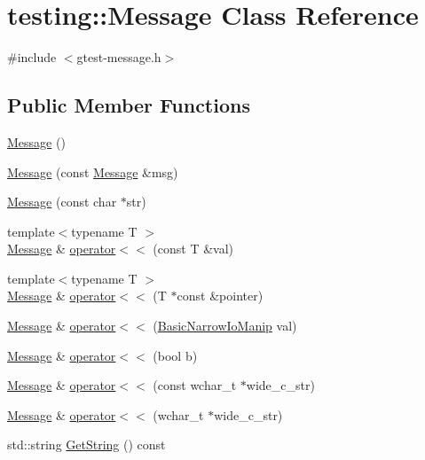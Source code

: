 \hypertarget{classtesting_1_1Message}{}\section{testing\+:\+:Message Class Reference}
\label{classtesting_1_1Message}


{\ttfamily \#include $<$gtest-\/message.\+h$>$}

\subsection*{Public Member Functions}
\begin{DoxyCompactItemize}
\item 
\hyperlink{classtesting_1_1Message_af5ba7216630df9845f18feb64b1a5383}{Message} ()
\item 
\hyperlink{classtesting_1_1Message_ac126e24804817a053bebba0920d94a11}{Message} (const \hyperlink{classtesting_1_1Message}{Message} \&msg)
\item 
\hyperlink{classtesting_1_1Message_a9de694ca239486809fc99fbbea8ac21d}{Message} (const char $\ast$str)
\item 
{\footnotesize template$<$typename T $>$ }\\\hyperlink{classtesting_1_1Message}{Message} \& \hyperlink{classtesting_1_1Message_a2e0e71be52d54c20a75a55fca812721f}{operator$<$$<$} (const T \&val)
\item 
{\footnotesize template$<$typename T $>$ }\\\hyperlink{classtesting_1_1Message}{Message} \& \hyperlink{classtesting_1_1Message_aa3ab685879958f90d2d8cd5b68d10c34}{operator$<$$<$} (T $\ast$const \&pointer)
\item 
\hyperlink{classtesting_1_1Message}{Message} \& \hyperlink{classtesting_1_1Message_a3a71a1c1c8ea52de5852d75483d41453}{operator$<$$<$} (\hyperlink{classtesting_1_1Message_ad398b70e2a11b923cef05c809b0eeb92}{Basic\+Narrow\+Io\+Manip} val)
\item 
\hyperlink{classtesting_1_1Message}{Message} \& \hyperlink{classtesting_1_1Message_a3e1e04f23b1bdfe18adfd59928296346}{operator$<$$<$} (bool b)
\item 
\hyperlink{classtesting_1_1Message}{Message} \& \hyperlink{classtesting_1_1Message_a34774e225944cb6df02db9689d312aae}{operator$<$$<$} (const wchar\+\_\+t $\ast$wide\+\_\+c\+\_\+str)
\item 
\hyperlink{classtesting_1_1Message}{Message} \& \hyperlink{classtesting_1_1Message_aae57eefb3a72a19c11453d630b1d846c}{operator$<$$<$} (wchar\+\_\+t $\ast$wide\+\_\+c\+\_\+str)
\item 
std\+::string \hyperlink{classtesting_1_1Message_a2cdc4df62bdcc9df37651a1cf527704e}{Get\+String} () const
\end{DoxyCompactItemize}
